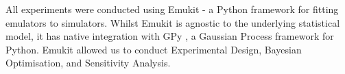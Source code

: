 \documentclass{article}
\newcommand{\harry}[1]{\sethlcolor{green}\hl{[Harry: #1]}}
\newcommand{\matteo}[1]{\sethlcolor{red}\hl{[Matteo: #1]}}
\newcommand{\harry}[1]{}
\begin{document}
All experiments were conducted using Emukit \cite{emukit2019} - a Python framework for fitting emulators to simulators. Whilst Emukit is agnostic to the underlying statistical model, it has native integration with GPy \cite{gpy2014}, a Gaussian Process framework for Python. Emukit allowed us to conduct Experimental Design, Bayesian Optimisation, and Sensitivity Analysis. %




\end{document}
